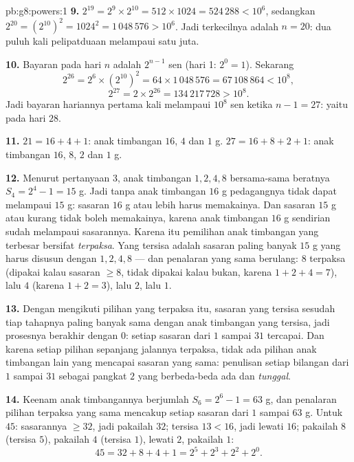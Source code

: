 \begin{solution}{pb:g8:powers:1}
\textbf{9.} $2^{19} = 2^9 \times 2^{10} = 512 \times 1024 =
524\,288 < 10^6$, sedangkan $2^{20} = \left(2^{10}\right)^2 =
1024^2 = 1\,048\,576 > 10^6$. Jadi  terkecilnya adalah
$n = 20$: dua puluh kali pelipatduaan melampaui satu juta.

\textbf{10.} Bayaran pada hari $n$ adalah $2^{n-1}$ sen (hari 1:
$2^0 = 1$). Sekarang
\[
2^{26} = 2^6 \times \left(2^{10}\right)^2
= 64 \times 1\,048\,576 = 67\,108\,864 < 10^8,
\]
\[
2^{27} = 2 \times 2^{26} = 134\,217\,728 > 10^8 .
\]
Jadi bayaran hariannya pertama kali melampaui $10^8$ sen ketika
$n - 1 = 27$: yaitu pada hari $28$.

\textbf{11.} $21 = 16 + 4 + 1$: anak timbangan $16$, $4$ dan $1$ g.
$27 = 16 + 8 + 2 + 1$: anak timbangan $16$, $8$, $2$ dan $1$ g.

\textbf{12.} Menurut pertanyaan 3, anak timbangan $1, 2, 4, 8$
bersama-sama beratnya $S_4 = 2^4 - 1 = 15$ g. Jadi tanpa anak
timbangan $16$ g pedagangnya tidak dapat melampaui $15$ g: sasaran
$16$ g atau lebih harus memakainya. Dan sasaran $15$ g atau kurang
tidak boleh memakainya, karena anak timbangan $16$ g sendirian sudah
melampaui sasarannya. Karena itu pemilihan anak timbangan yang
terbesar bersifat \emph{terpaksa}. Yang tersisa adalah sasaran paling
banyak $15$ g yang harus disusun dengan $1, 2, 4, 8$ --- dan
penalaran yang sama berulang: $8$ terpaksa (dipakai kalau sasaran
 $\geq 8$, tidak dipakai kalau bukan, karena
$1 + 2 + 4 = 7$), lalu $4$ (karena $1 + 2 = 3$), lalu $2$, lalu $1$.

\textbf{13.} Dengan mengikuti pilihan yang terpaksa itu, sasaran yang
tersisa sesudah tiap tahapnya paling banyak sama dengan  anak
timbangan yang tersisa, jadi prosesnya berakhir dengan  $0$:
setiap sasaran dari $1$ sampai $31$ tercapai. Dan karena setiap
pilihan sepanjang jalannya terpaksa, tidak ada pilihan anak timbangan
lain yang mencapai sasaran yang sama: penulisan setiap bilangan dari
$1$ sampai $31$ sebagai  pangkat $2$ yang berbeda-beda ada dan
\emph{tunggal}.

\textbf{14.} Keenam anak timbangannya berjumlah $S_6 = 2^6 - 1 = 63$
g, dan penalaran pilihan terpaksa yang sama mencakup setiap sasaran
dari $1$ sampai $63$ g. Untuk $45$: sasarannya $\geq 32$, jadi
pakailah $32$; tersisa $13 < 16$, jadi lewati $16$; pakailah $8$
(tersisa $5$), pakailah $4$ (tersisa $1$), lewati $2$, pakailah $1$:
\[
45 = 32 + 8 + 4 + 1 = 2^5 + 2^3 + 2^2 + 2^0 .
\]


\end{solution}
